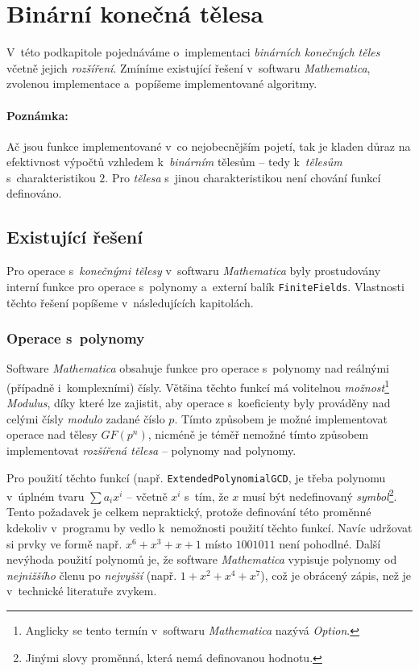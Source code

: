 \documentclass[thesis=M,czech,hidelinks]{FITthesis}[2012/06/26]
\newcommand{\0}{{\textcolor[gray]{0.75}{0}}}
\begin{document}
\section{Binární konečná tělesa}

V~této podkapitole pojednáváme o~implementaci \emph{binárních konečných těles}
včetně jejich \emph{rozšíření}. Zmíníme existující řešení v~softwaru
\emph{Mathematica}, zvolenou implementace a~popíšeme implementované algoritmy.

\paragraph{Poznámka:} Ač jsou funkce implementované v~co nejobecnějším pojetí,
tak je kladen důraz na efektivnost výpočtů vzhledem k~\emph{binárním} tělesům --
tedy k~\emph{tělesům} s~charakteristikou $2$. Pro \emph{tělesa} s~jinou
charakteristikou není chování funkcí definováno.

\subsection{Existující řešení}

Pro operace s~\emph{konečnými tělesy} v~softwaru \emph{Mathematica} byly
prostudovány interní funkce pro operace s~polynomy a~externí balík
\texttt{FiniteFields}. Vlastnosti těchto řešení popíšeme v~následujících
kapitolách.

\subsubsection{Operace s~polynomy}

Software \emph{Mathematica} obsahuje funkce pro operace s~polynomy nad reálnými
(případně i~komplexními) čísly. Většina těchto funkcí má volitelnou
\emph{možnost}\footnote{
    Anglicky se tento termín v~softwaru \emph{Mathematica} nazývá \emph{Option}.
} \emph{Modulus}, díky které lze zajistit, aby operace s~koeficienty byly
prováděny nad celými čísly \emph{modulo} zadané číslo $p$. Tímto způsobem je
možné implementovat operace nad tělesy $GF(p^n)$, nicméně je téměř nemožné tímto
způsobem implementovat \emph{rozšířená tělesa} -- polynomy nad polynomy.

Pro použití těchto funkcí (např. \texttt{ExtendedPolynomialGCD}, je třeba
polynomu v~úplném tvaru $\sum a_i x^i$ -- včetně $x^i$ s~tím, že $x$ musí být
nedefinovaný \emph{symbol}\footnote{
    Jinými slovy proměnná, která nemá definovanou hodnotu.
}. Tento požadavek je celkem nepraktický, protože definování této proměnné
kdekoliv v~programu by vedlo k~nemožnosti použití těchto funkcí. Navíc udržovat
si prvky ve formě např. $x^6 + x^3 + x + 1$ místo $1001011$ není pohodlné.
Další nevýhoda použití polynomů je, že software \emph{Mathematica} vypisuje
polynomy od \emph{nejnižšího} členu po \emph{nejvyšší} (např. $1+x^2+x^4+x^7$),
což je obrácený zápis, než je v~technické literatuře zvykem.
\end{document}
